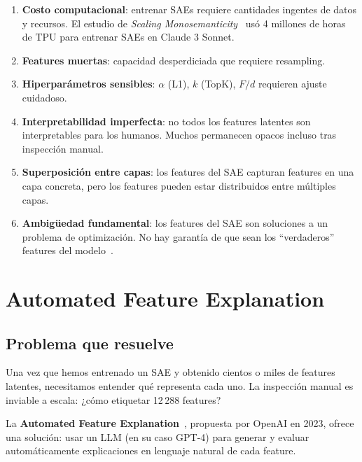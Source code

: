 \documentclass[11pt,a4paper]{report}
\theoremstyle{definition}
\begin{document}
\begin{enumerate}
    \item \textbf{Costo computacional}: entrenar SAEs requiere cantidades ingentes de datos y recursos. El estudio de \emph{Scaling Monosemanticity}~\cite{templeton2024scalingmono} usó 4 millones de horas de TPU para entrenar SAEs en Claude 3 Sonnet.
    \item \textbf{Features muertas}: capacidad desperdiciada que requiere resampling.
    \item \textbf{Hiperparámetros sensibles}: $\alpha$ (L1), $k$ (TopK), $F/d$ requieren ajuste cuidadoso.
    \item \textbf{Interpretabilidad imperfecta}: no todos los features latentes son interpretables para los humanos. Muchos permanecen opacos incluso tras inspección manual.
    \item \textbf{Superposición entre capas}: los features del SAE capturan features en una capa concreta, pero los features pueden estar distribuidos entre múltiples capas.
    \item \textbf{Ambigüedad fundamental}: los features del SAE son soluciones a un problema de optimización. No hay garantía de que sean los ``verdaderos'' features del modelo~\cite{makelov2024saeidentity}.
\end{enumerate}

\newpage

\chapter{Automated Feature Explanation}
\label{ch:auto-feat}

\section{Problema que resuelve}

Una vez que hemos entrenado un SAE y obtenido cientos o miles de features latentes, necesitamos entender qué representa cada uno. La inspección manual es inviable a escala: ¿cómo etiquetar 12\,288 features?

La \textbf{Automated Feature Explanation}~\cite{bills2023automatedexplanation}, propuesta por OpenAI en 2023, ofrece una solución: usar un LLM (en su caso GPT-4) para generar y evaluar automáticamente explicaciones en lenguaje natural de cada feature.
\end{document}
